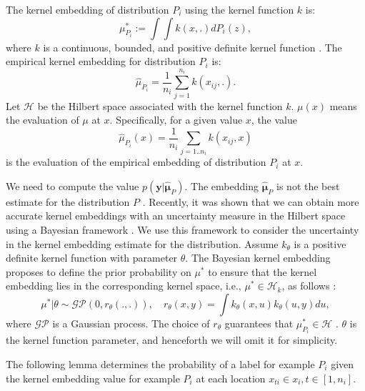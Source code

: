 \documentclass[12pt]{article}
\begin{document}
	The kernel embedding of distribution $P_i$ using the kernel function $k$ is:
	\begin{equation}
		\mu^*_{P_i} := \int \int k(x, .) dP_i(z),
	\end{equation}
	where $k$ is a continuous, bounded, and positive definite kernel function \cite{muandet2012domain}. The empirical kernel embedding for distribution $P_i$ is:
	\begin{equation}
		\hat{\mu}_{P_i} = \frac{1}{n_i} \sum_{j=1}^{n_i} k(x_{ij}, .).
	\end{equation}
	Let $\mathcal{H}$ be the Hilbert space associated with the kernel function $k$. $\mu(x)$ means the evaluation of $\mu$ at $x$. Specifically, for a given value $x$, the value
	\begin{equation}
		\hat{\mu}_{P_i}(x) = \frac{1}{n_i} \sum_{j=1..n_i} k(x_{ij}, x)
	\end{equation}
	is the evaluation of the empirical embedding of distribution $P_i$ at $x$.
	
	We need to compute the value $p(\mathbf{y}|\hat{\boldsymbol{\mu}}_P)$. The embedding $\hat{\boldsymbol{\mu}}_P$ is not the best estimate for the distribution $P$ \cite{muandet2012domain}. Recently, it was shown that we can obtain more accurate kernel embeddings with an uncertainty measure in the Hilbert space using a Bayesian framework \cite{flaxman2015fast}. We use this framework to consider the uncertainty in the kernel embedding estimate for the distribution. Assume $k_\theta$ is a positive definite kernel function with parameter $\theta$. The Bayesian kernel embedding proposes to define the prior probability on $\mu^*$ to ensure that the kernel embedding lies in the corresponding kernel space, i.e., $\mu^* \in \mathcal{H}_k$, as follows \cite{flaxman2015fast}:
	\begin{equation}
		\mu^* | \theta \sim \mathcal{GP}(0, r_\theta(., .)), \quad r_\theta(x, y) = \int k_\theta(x, u) k_\theta(u, y) du,
	\end{equation}
	where $\mathcal{GP}$ is a Gaussian process. The choice of $r_\theta$ guarantees that $\mu^*_{P_i} \in \mathcal{H}$ \cite{flaxman2015fast}. $\theta$ is the kernel function parameter, and henceforth we will omit it for simplicity.
	
	The following lemma determines the probability of a label for example $P_i$ given the kernel embedding value for example $P_i$ at each location $x_{ti} \in x_i, t \in [1, n_i]$.
	
\end{document}
